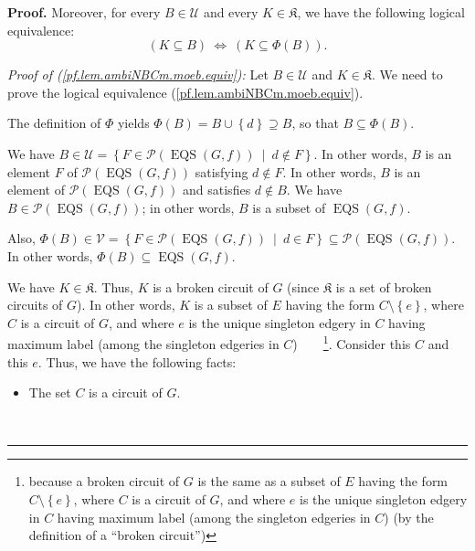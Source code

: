 \documentclass[numbers=enddot,12pt,final,onecolumn,notitlepage]{scrartcl}%
\theoremstyle{definition}
\newenvironment{proof}[1][Proof]{\noindent\textbf{#1.} }{\ \rule{0.5em}{0.5em}}
\newenvironment{verlong}{}{}
\begin{document}
\begin{proof}
\begin{verlong}
Moreover, for every $B\in\mathcal{U}$ and every $K\in\mathfrak{K}$, we have
the following logical equivalence:%
\begin{equation}
\left(  K\subseteq B\right)  \ \Longleftrightarrow\ \left(  K\subseteq
\Phi\left(  B\right)  \right)  . \label{pf.lem.ambiNBCm.moeb.equiv}%
\end{equation}


\textit{Proof of (\ref{pf.lem.ambiNBCm.moeb.equiv}):} Let $B\in\mathcal{U}$
and $K\in\mathfrak{K}$. We need to prove the logical equivalence
(\ref{pf.lem.ambiNBCm.moeb.equiv}).

The definition of $\Phi$ yields $\Phi\left(  B\right)  =B\cup\left\{
d\right\}  \supseteq B$, so that $B\subseteq\Phi\left(  B\right)  $.

We have $B\in\mathcal{U}=\left\{  F\in\mathcal{P}\left(  \operatorname*{EQS}%
\left(  G,f\right)  \right)  \ \mid\ d\notin F\right\}  $. In other words, $B$
is an element $F$ of $\mathcal{P}\left(  \operatorname*{EQS}\left(
G,f\right)  \right)  $ satisfying $d\notin F$. In other words, $B$ is an
element of $\mathcal{P}\left(  \operatorname*{EQS}\left(  G,f\right)  \right)
$ and satisfies $d\notin B$. We have $B\in\mathcal{P}\left(
\operatorname*{EQS}\left(  G,f\right)  \right)  $; in other words, $B$ is a
subset of $\operatorname*{EQS}\left(  G,f\right)  $.

Also, $\Phi\left(  B\right)  \in\mathcal{V}=\left\{  F\in\mathcal{P}\left(
\operatorname*{EQS}\left(  G,f\right)  \right)  \ \mid\ d\in F\right\}
\subseteq\mathcal{P}\left(  \operatorname*{EQS}\left(  G,f\right)  \right)  $.
In other words, $\Phi\left(  B\right)  \subseteq\operatorname*{EQS}\left(
G,f\right)  $.

We have $K\in\mathfrak{K}$. Thus, $K$ is a broken circuit of $G$ (since
$\mathfrak{K}$ is a set of broken circuits of $G$). In other words, $K$ is a
subset of $E$ having the form $C\setminus\left\{  e\right\}  $, where $C$ is a
circuit of $G$, and where $e$ is the unique singleton edgery in $C$ having
maximum label (among the singleton edgeries in $C$)\ \ \ \ \footnote{because a
broken circuit of $G$ is the same as a subset of $E$ having the form
$C\setminus\left\{  e\right\}  $, where $C$ is a circuit of $G$, and where $e$
is the unique singleton edgery in $C$ having maximum label (among the
singleton edgeries in $C$) (by the definition of a \textquotedblleft broken
circuit\textquotedblright)}. Consider this $C$ and this $e$. Thus, we have the
following facts:

\begin{itemize}
\item The set $C$ is a circuit of $G$.


\end{itemize}
\end{verlong}
\end{proof}
\end{document}
